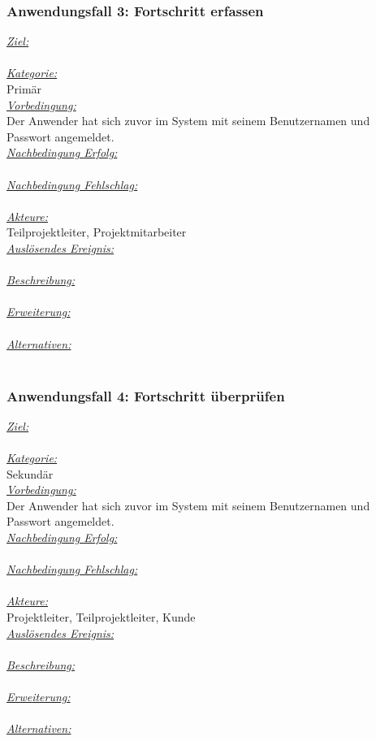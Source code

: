 \subsubsection{Anwendungsfall 3: Fortschritt erfassen}
\underline{\emph{Ziel:}}\\
\\
\underline{\emph{Kategorie:}} \\
Primär\\
\underline{\emph{Vorbedingung:}} \\
Der Anwender hat sich zuvor im System mit seinem Benutzernamen und Passwort angemeldet.\\
\underline{\emph{Nachbedingung Erfolg:}} \\
\\
\underline{\emph{Nachbedingung Fehlschlag:}} \\
\\
\underline{\emph{Akteure:}} \\
Teilprojektleiter, Projektmitarbeiter\\
\underline{\emph{Auslösendes Ereignis:}} \\
\\
\underline{\emph{Beschreibung:}} \\
\\
\underline{\emph{Erweiterung:}} \\
\\
\underline{\emph{Alternativen:}} \\
\\

\subsubsection{Anwendungsfall 4: Fortschritt überprüfen}
\underline{\emph{Ziel:}}\\
\\
\underline{\emph{Kategorie:}} \\
Sekundär\\
\underline{\emph{Vorbedingung:}} \\
Der Anwender hat sich zuvor im System mit seinem Benutzernamen und Passwort angemeldet.\\
\underline{\emph{Nachbedingung Erfolg:}} \\
\\
\underline{\emph{Nachbedingung Fehlschlag:}} \\
\\
\underline{\emph{Akteure:}} \\
Projektleiter, Teilprojektleiter, Kunde\\
\underline{\emph{Auslösendes Ereignis:}} \\
\\
\underline{\emph{Beschreibung:}} \\
\\
\underline{\emph{Erweiterung:}} \\
\\
\underline{\emph{Alternativen:}} \\
\\

